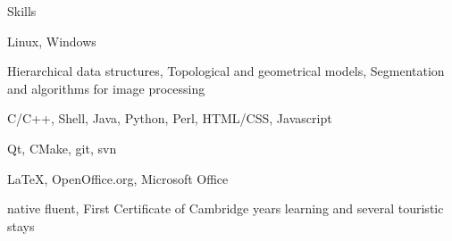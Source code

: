 \begin{rubric}{Skills}
  

  Linux, Windows
  
  Hierarchical data structures, Topological and geometrical models, Segmentation and algorithms for image processing

  C/C++, Shell, Java, Python, Perl, HTML/CSS, Javascript
  
  \entry*[Tools]%
  Qt, CMake, git, svn

  \entry*[Office]%
  \LaTeX{}, OpenOffice.org, Microsoft Office
  
  \entry*[French] 
  native
  \entry*[English] 
  fluent, First Certificate of Cambridge
   years learning and several touristic stays
  
\end{rubric}
